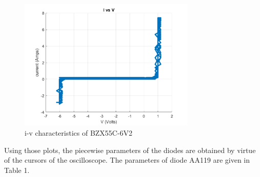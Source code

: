 \documentclass[letterpaper,12pt]{article}
\begin{document}
\begin{figure}[H]
    \centering
    \includegraphics[width = 0.75\textwidth]{1_zener.png}
    \caption{i-v characteristics of BZX55C-6V2}
\end{figure} 


Using those plots, the piecewise parameters of the diodes are obtained by virtue of the cursors of the oscilloscope. The parameters of diode AA119 are given in Table 1.
\end{document}
